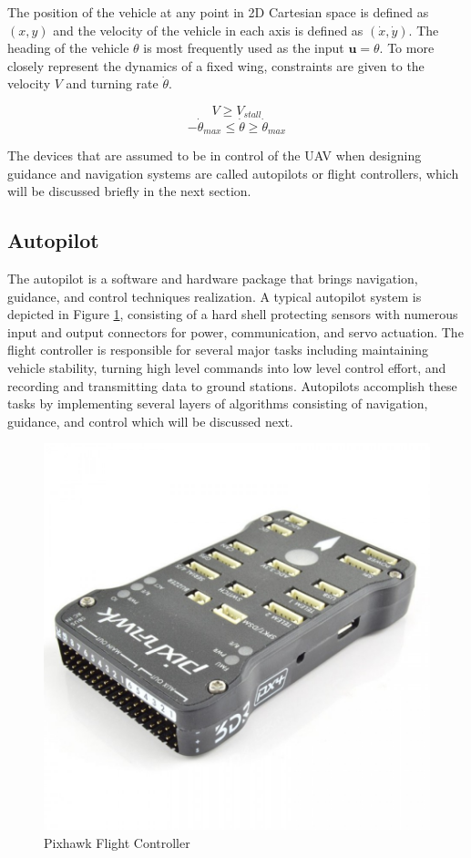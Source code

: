 \documentclass[numbered,pdftex]{ohio-etd}
\begin{document}
The position of the vehicle at any point in 2D Cartesian space is defined as $(x,y)$ and the velocity of the vehicle in each axis is defined as $(\dot{x},\dot{y})$. The heading of the vehicle $\theta$ is most frequently used as the input $\boldsymbol{u} = \theta$. To more closely represent the dynamics of a fixed wing, constraints are given to the velocity $V$ and turning rate $\dot{\theta}$. 

 \begin{equation}\label{minVel}
V \geq V_{stall}
\end{equation}
\begin{equation}\label{headingRate}
-\dot{\theta}_{max} \leq \dot{\theta} \geq \dot{\theta}_{max}
\end{equation}

The devices that are assumed to be in control of the UAV when designing guidance and navigation systems are called autopilots or flight controllers, which will be discussed briefly in the next section. 


\subsection{Autopilot}
The autopilot is a software and hardware package that brings navigation, guidance, and control techniques realization. A typical autopilot system is depicted in Figure \ref{fig:pixhawk}, consisting of a hard shell protecting sensors with numerous input and output connectors for power, communication, and servo actuation. The flight controller is responsible for several major tasks including maintaining vehicle stability, turning high level commands into low level control effort, and recording and transmitting data to ground stations. Autopilots accomplish these tasks by implementing several layers of algorithms consisting of navigation, guidance, and control which will be discussed next.

\begin{figure}[h]
	\centering
	\includegraphics[width=0.7\linewidth]{PaperFigures/pixhawk}
	\caption{Pixhawk Flight Controller}
	\label{fig:pixhawk}
\end{figure}
\end{document}
